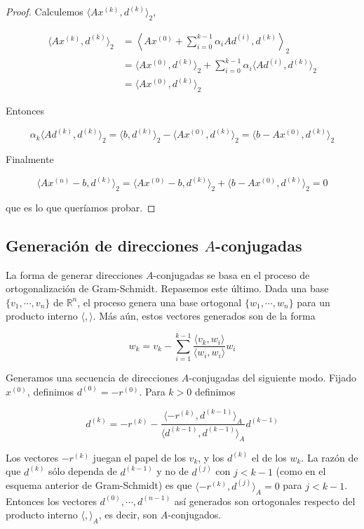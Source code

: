 \begin{propo}
\begin{proof}
Calculemos $\langle Ax^{(k)}, d^{(k)} \rangle_2$,

\begin{align*}
\langle Ax^{(k)}, d^{(k)} \rangle_2 &= \left\langle Ax^{(0)} + \sum_{i = 0}^{k - 1} \alpha_i A d^{(i)}, d^{(k)} \right\rangle_2 \\
& = \langle Ax^{(0)}, d^{(k)}\rangle_2 + \sum_{i = 0}^{k - 1} \alpha_i \langle A d^{(i)}, d^{(k)} \rangle_2\\
& = \langle Ax^{(0)}, d^{(k)}\rangle_2
\end{align*}

Entonces

\[\alpha_k \langle Ad^{(k)}, d^{(k)} \rangle_2 = \langle b, d^{(k)} \rangle_2 - \langle Ax^{(0)}, d^{(k)}\rangle_2 = \langle b - Ax^{(0)}, d^{(k)} \rangle_2\]

Finalmente

\[\langle Ax^{(n)} - b, d^{(k)} \rangle_2 = \langle Ax^{(0)} - b, d^{(k)} \rangle_2 + \langle b - Ax^{(0)}, d^{(k)} \rangle_2 = 0\]

que es lo que queríamos probar.

\end{proof}
\end{propo}

\subsection{Generación de direcciones $A$-conjugadas}

La forma de generar direcciones $A$-conjugadas se basa en el proceso de ortogonalización de Gram-Schmidt. Repasemos este último. Dada una base $\{v_1, \cdots, v_n\}$ de $\mathbb{R}^n$, el proceso genera una base ortogonal $\{w_1, \cdots, w_n\}$ para un producto interno $\langle, \rangle$. Más aún, estos vectores generados son de la forma

\[w_k = v_k - \sum_{i = 1}^{k - 1}\frac{\langle v_k, w_i\rangle}{\langle w_i, w_i \rangle} w_i\]

Generamos una secuencia de direcciones $A$-conjugadas del siguiente modo. Fijado $x^{(0)}$, definimos $d^{(0)} = -r^{(0)}$. Para $k > 0$ definimos

\[d^{(k)} = -r^{(k)} - \frac{\langle-r^{(k)}, d^{(k - 1)}\rangle_A}{\langle d^{(k - 1)}, d^{(k - 1)} \rangle_A} d^{(k - 1)}\]

Los vectores $-r^{(k)}$ juegan el papel de los $v_k$, y los $d^{(k)}$ el de los $w_k$. La razón de que $d^{(k)}$ sólo dependa de $d^{(k - 1)}$ y no de $d^{(j)}$ con $j < k - 1$ (como en el esquema anterior de Gram-Schmidt) es que $\langle -r^{(k)} , d^{(j)} \rangle_A = 0$ para $j < k - 1$. Entonces los vectores $d^{(0)}, \cdots, d^{(n - 1)}$ así generados son ortogonales respecto del producto interno $\langle , \rangle_A$, es decir, son $A$-conjugados.

